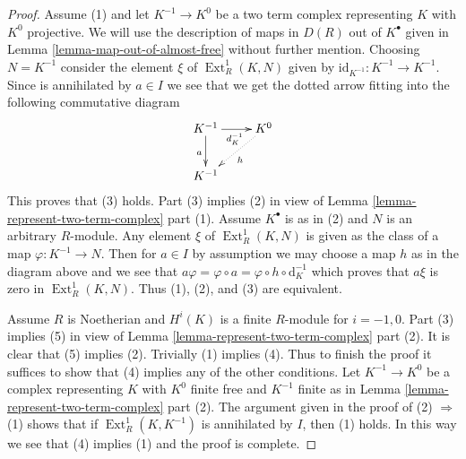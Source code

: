 \documentclass[10pt,a4paper]{amsart}
\theoremstyle{plain}
\theoremstyle{definition}
\theoremstyle{remark}
\numberwithin{equation}{subsection}
\def\Ext{\mathop{\mathrm{Ext}}\nolimits}
\begin{document}
\begin{proof}

\medskip\noindent
Assume (1) and let $K^{-1} \to K^0$
be a two term complex representing $K$
with $K^0$ projective.
We will use the description of maps in $D(R)$ out of $K^\bullet$ given in
Lemma \ref{lemma-map-out-of-almost-free} without further mention.
Choosing $N = K^{-1}$ consider the element $\xi$ of $\Ext^1_R(K, N)$
given by $\text{id}_{K^{-1}} : K^{-1} \to K^{-1}$. Since is annihilated
by $a \in I$ we see that we get the dotted arrow fitting into the
following commutative diagram
$$
\xymatrix{
K^{-1} \ar[d]_a \ar[r]_{d_K^{-1}} & K^0 \ar@{..>}[ld]^h \\
K^{-1}
}
$$
This proves that (3) holds. Part (3) implies (2) in view of
Lemma \ref{lemma-represent-two-term-complex} part (1). Assume
$K^\bullet$ is as in (2) and $N$ is an arbitrary $R$-module.
Any element $\xi$ of $\Ext^1_R(K, N)$ is given as the class of
a map $\varphi : K^{-1} \to N$. Then for $a \in I$ by assumption
we may choose a map $h$ as in the diagram above and we see that
$a\varphi = \varphi \circ a = \varphi \circ h \circ \text{d}_K^{-1}$
which proves that $a \xi$ is zero in $\Ext^1_R(K, N)$.
Thus (1), (2), and (3) are equivalent.

\medskip\noindent
Assume $R$ is Noetherian and $H^i(K)$ is a finite $R$-module for $i = -1, 0$.
Part (3) implies (5) in view of
Lemma \ref{lemma-represent-two-term-complex} part (2).
It is clear that (5) implies (2). Trivially (1) implies (4).
Thus to finish the proof it suffices to show that (4) implies
any of the other conditions. Let $K^{-1} \to K^0$ be a complex
representing $K$ with $K^0$ finite free and $K^{-1}$ finite as in
Lemma \ref{lemma-represent-two-term-complex} part (2). The argument
given in the proof of (2) $\Rightarrow$ (1)
shows that if $\Ext^1_R(K, K^{-1})$ is annihilated by $I$,
then (1) holds. In this way we see that (4) implies (1) and the
proof is complete.
\end{proof}
\end{document}
